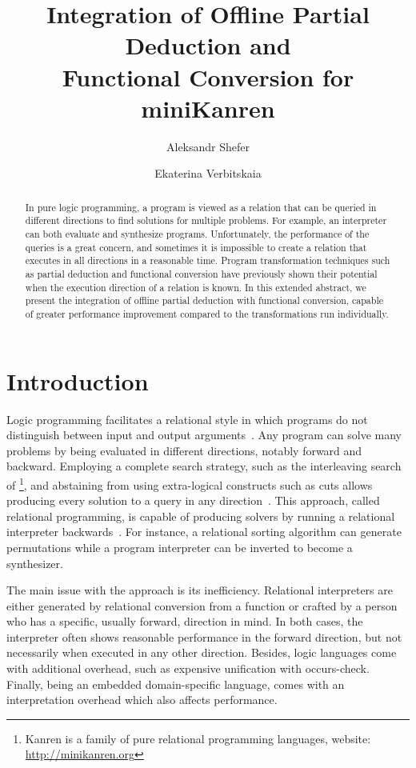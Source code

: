 \documentclass[submission,copyright,creativecommons]{eptcs}
\title{Integration of Offline Partial Deduction and\\ Functional Conversion for miniKanren}
\author{Aleksandr Shefer
\institute{Constructor University \\ Bremen, Germany}
\institute{JetBrains Research \\
Germany}
\email{alex.shefer.31@gmail.com}
\and
Ekaterina Verbitskaia
\institute{Constructor University \\ Bremen, Germany}
\institute{JetBrains Research \\ Amsterdam, Netherlands}
\email{kajigor@gmail.com}
}
\begin{document}
\maketitle

\begin{abstract}

In pure logic programming, a program is viewed as a relation that can be queried in different directions to find solutions for multiple problems. 
For example, an interpreter can both evaluate and synthesize programs. 
Unfortunately, the performance of the queries is a great concern, and sometimes it is impossible to create a relation that executes in all directions in a reasonable time. 
Program transformation techniques such as partial deduction and functional conversion have previously shown their potential when the execution direction of a relation is known. 
In this extended abstract, we present the integration of offline partial deduction with functional conversion, capable of greater performance improvement compared to the transformations run individually. 

\end{abstract}

\section{Introduction}

Logic programming facilitates a relational style in which programs do not distinguish between input and output arguments~\cite{TheReasonedSchemer}. 
Any program can solve many problems by being evaluated in different directions, notably forward and backward. 
Employing a complete search strategy, such as the interleaving search of \kanren \footnote{Kanren is a family of pure relational programming languages, website: \url{http://minikanren.org}}, and abstaining from using extra-logical constructs such as cuts allows producing every solution to a query in any direction~\cite{kiselyov2005backtracking}. 
This approach, called relational programming, is capable of producing solvers by running a relational interpreter backwards~\cite{lozov2019relational}.
For instance, a relational sorting algorithm can generate permutations while a program interpreter can be inverted to become a synthesizer. 

The main issue with the approach is its inefficiency.
Relational interpreters are either generated by relational conversion from a function or crafted by a person who has a specific, usually forward, direction in mind. 
In both cases, the interpreter often shows reasonable performance in the forward direction, but not necessarily when executed in any other direction. 
Besides, logic languages come with additional overhead, such as expensive unification with occurs-check. 
Finally, being an embedded domain-specific language, \kanren comes with an interpretation overhead which also affects performance. 
\end{document}

